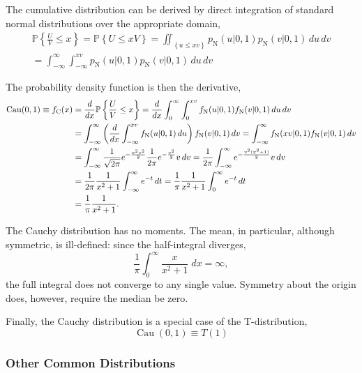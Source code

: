 \documentclass[12pt, twoside, draft]{article}
\begin{document}
The cumulative distribution can be derived by direct integration of standard normal distributions over the appropriate domain,
\begin{multline}
\mathbb{P} \left\{ \frac{U}{V} \leq x \right\} = \mathbb{P} \left\{ U \leq xV \right\} = \iint_{\left\{u \leq xv\right\}} p_{\operatorname{N}}(u|0,1) p_{\operatorname{N}}(v|0,1) \,du\,dv \\
= \int_{-\infty}^\infty \int_{-\infty}^{xv} p_{\operatorname{N}}(u|0,1)p_{\operatorname{N}}(v|0,1)\,du\,dv
\end{multline}

The probability density function is then the derivative,
\begin{align}
\operatorname{Cau}(0,1) \equiv f_{\operatorname{C}}(x) &= \frac{d}{dx} \mathbb{P} \left\{ \frac{U}{V} \leq x \right\} = \frac{d}{dx} \int_0^\infty \int_0^{xv} f_{\operatorname{N}}(u|0,1)f_{\operatorname{N}}(v|0,1)\,du\,dv \notag \\
&= \int_{-\infty}^{\infty} \left( \frac{d}{dx} \int_{-\infty}^{xv} f_{\operatorname{N}}(u|0,1)\,du \right) f_{\operatorname{N}}(v|0,1)\,dv = \int_{-\infty}^{\infty} f_{\operatorname{N}}(xv|0,1) f_{\operatorname{N}}(v|0,1) \,dv \notag \\
&= \int_{-\infty}^{\infty} \frac{1}{\sqrt{2\pi}} e^{-\frac{x^2v^2}{2}} \frac{1}{2\pi} e^{-\frac{v^2}{2}}v\,dv = \frac{1}{2\pi} \int_{-\infty}^{\infty} e^{-\frac{v^2(x^2+1)}{2}} v\,dv \notag \\
&= \frac{1}{2\pi}\frac{1}{x^2+1} \int_{-\infty}^{\infty} e^{-t}\,dt = \frac{1}{\pi}\frac{1}{x^2+1} \int_0^{\infty} e^{-t}\,dt \notag \\
&= \frac{1}{\pi}\frac{1}{x^2+1}.
\end{align}

The Cauchy distribution has no moments.  The mean, in particular, although symmetric, is ill-defined: since the half-integral diverges,
\begin{equation}
\frac{1}{\pi} \int_0^\infty \frac{x}{x^2 + 1}\;dx = \infty,
\end{equation}
the full integral does not converge to any single value.  Symmetry about the origin does, however, require the median be zero.

Finally, the Cauchy distribution is a special case of the T-distribution,
\begin{equation}
\operatorname{Cau}(0,1) \equiv T(1)
\end{equation}

\subsubsection{Other Common  Distributions}\label{sec:other_common_distributions}
\end{document}
